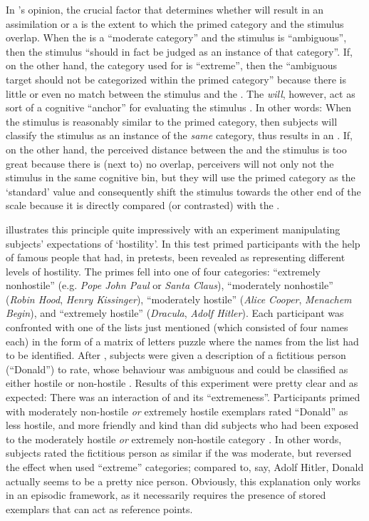 In \citeauthor{herr1986}'s opinion, the crucial factor that determines whether  will result in an assimilation or a  is the extent to which the primed category and the stimulus overlap.
When the  is a ``moderate category'' and the stimulus is ``ambiguous'', then the stimulus ``should in fact be judged as an instance of that category''.
If, on the other hand, the category used for  is ``extreme'', then the ``ambiguous target should not be categorized within the primed category'' because there is little or even no match between the stimulus and the .
The  \emph{will}, however, act as sort of a cognitive ``anchor'' for evaluating the stimulus \parencite[cf.][1107]{herr1986}.
In other words: When the stimulus is reasonably similar to the primed category, then subjects will classify the stimulus as an instance of the \emph{same} category,  thus results in an .
If, on the other hand, the perceived distance between the  and the stimulus is too great because there is (next to) no overlap, perceivers will not only not  the stimulus in the same cognitive bin, but they will use the primed category as the `standard' value and consequently shift the stimulus towards the other end of the scale because it is directly compared (or contrasted) with the .

\citeauthor{herr1986} illustrates this principle quite impressively with an experiment manipulating subjects' expectations of `hostility'.
In this test \citeauthor{herr1986} primed participants with the help of famous people that had, in pretests, been revealed as representing different levels of hostility.
The primes fell into one of four categories: ``extremely nonhostile'' (e.g. \emph{Pope John Paul} or \emph{Santa Claus}), ``moderately nonhostile'' (\emph{Robin Hood}, \emph{Henry Kissinger}), ``moderately hostile'' (\emph{Alice Cooper}, \emph{Menachem Begin}), and ``extremely hostile'' (\emph{Dracula}, \emph{Adolf Hitler}).
Each participant was confronted with one of the lists just mentioned (which consisted of four names each) in the form of a matrix of letters puzzle where the names from the list had to be identified.
After , subjects were given a description of a fictitious person (``Donald'') to rate, whose behaviour was ambiguous and could be classified as either hostile or non-hostile \parencite[cf.][1108]{herr1986}.
Results of this experiment were pretty clear and as expected: There was an interaction of  and its ``extremeness''.
Participants primed with moderately non-hostile \emph{or} extremely hostile exemplars rated ``Donald'' as less hostile, and more friendly and kind than did subjects who had been exposed to the moderately hostile \emph{or} extremely non-hostile category \parencite[cf.][1109]{herr1986}.
In other words, subjects rated the fictitious person as similar if the  was moderate, but reversed the effect when  used ``extreme'' categories; compared to, say, Adolf Hitler, Donald actually seems to be a pretty nice person.
Obviously, this explanation only works in an episodic framework, as it necessarily requires the presence of stored exemplars that can act as reference points.

